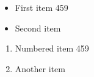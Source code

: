 \documentclass{article}
\begin{document}
\begin{itemize}
\item First item 459
\item Second item
\end{itemize}
\begin{enumerate}
\item Numbered item 459
\item Another item
\end{enumerate}
\end{document}
